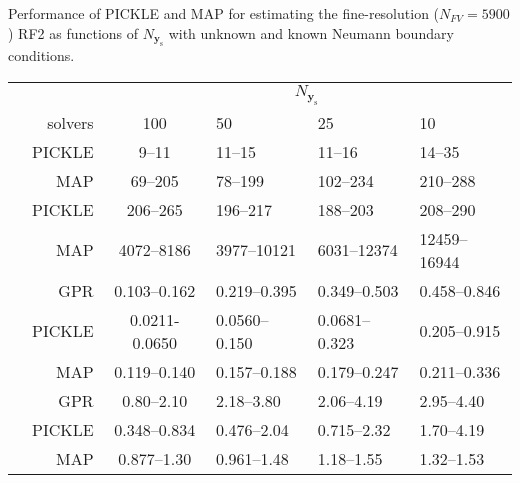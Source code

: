 \documentclass{agujournal2019}
\renewcommand{\caption}[2][]{\ignorespaces}
\begin{document}
\begin{table}[!htbp]
    \caption{Performance of PICKLE and MAP for estimating the fine-resolution ($N_{FV}=5900$) RF2 as functions of $N_{\mathbf{y}_{\mathrm{s}}}$ with
  \subref{tab:RF2_4x_unknown_flux_results} unknown and \subref{tab:RF2_4x_known_flux_results} known Neumann boundary conditions.}
    \label{tab:RF2_4x_flux_results}
    \begin{subtable}{\textwidth}
        \caption{Unknown Neumann boundary conditions}
        \label{tab:RF2_4x_unknown_flux_results}
        \begin{tabu} to 
            \toprule
            & &  \\
            & solvers & 100 & 50 & 25 & 10\\
            \midrule
             & PICKLE & 9--11 & 11--15 & 11--16 & 14--35 \\
            & MAP & 69--205 & 78--199 & 102--234 & 210--288 \\
            \midrule
             & PICKLE & 206--265 & 196--217 & 188--203 & 208--290 \\
            & MAP & 4072--8186 & 3977--10121 & 6031--12374 & 12459--16944 \\
            \midrule
             & GPR & 0.103--0.162 & 0.219--0.395 & 0.349--0.503 & 0.458--0.846 \\
            & PICKLE & 0.0211-0.0650 & 0.0560--0.150 & 0.0681--0.323 & 0.205--0.915 \\
            & MAP & 0.119--0.140 & 0.157--0.188 & 0.179--0.247 & 0.211--0.336 \\
            \midrule
             & GPR & 0.80--2.10 & 2.18--3.80 & 2.06--4.19 & 2.95--4.40 \\
            & PICKLE & 0.348--0.834 & 0.476--2.04 & 0.715--2.32 & 1.70--4.19 \\
            & MAP & 0.877--1.30 & 0.961--1.48 & 1.18--1.55 & 1.32--1.53 \\
            \bottomrule
        \end{tabu}
    \end{subtable}\\

\end{table}
\end{document}
